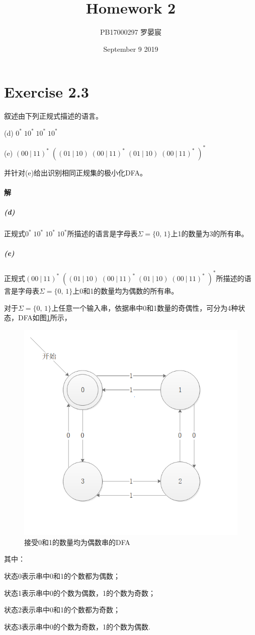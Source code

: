 \documentclass{article}
\title{Homework 2}
\author{PB17000297 罗晏宸}
\date{September 9 2019}
\begin{document}
\maketitle

\section{Exercise 2.3}
叙述由下列正规式描述的语言。\par
(d) $0^*\;10^*\;10^*\;10^*$\par
(e) $(00\ |\ 11)^*\;((01\ |\ 10)\;(00\ |\ 11)^*\;(01\ |\ 10)\;(00\ |\ 11)^*\;)^*$\par
并针对(e)给出识别相同正规集的极小化DFA。
\\

\paragraph{解}
\subparagraph{(d)}
正规式$0^*\;10^*\;10^*\;10^*$所描述的语言是字母表$\Sigma=\{0,\,1\}$上1的数量为3的所有串。
\subparagraph{(e)}
正规式$(00\ |\ 11)^*\;((01\ |\ 10)\;(00\ |\ 11)^*\;(01\ |\ 10)\;(00\ |\ 11)^*\;)^*$所描述的语言是字母表$\Sigma=\{0,\,1\}$上0和1的数量均为偶数的所有串。\par
对于$\Sigma=\{0,\,1\}$上任意一个输入串，依据串中0和1数量的奇偶性，可分为4种状态，DFA如图\ref{fig:1}所示，
\begin{figure}
\centering
\includegraphics[scale=1]{DFA1.png}
\caption{\label{fig:1}接受0和1的数量均为偶数串的DFA}

\end{figure}
其中：\par
状态0表示串中0和1的个数都为偶数；\par
状态1表示串中0的个数为偶数，1的个数为奇数；\par
状态2表示串中0和1的个数都为奇数；\par
状态3表示串中0的个数为奇数，1的个数为偶数.
\\
\end{document}
